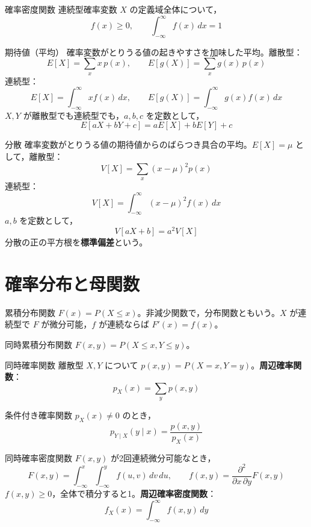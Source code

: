 \documentclass[a4paper,11pt]{ltjsarticle}
\begin{document}
\begin{term}{確率密度関数}
連続型確率変数 $X$ の定義域全体について，
\[
f(x) \ge 0, \qquad \int_{-\infty}^{\infty} f(x)\,dx = 1
\]
\end{term}

\begin{term}{期待値（平均）}
確率変数がとりうる値の起きやすさを加味した平均。離散型：
\[
E[X] = \sum_x x\,p(x), \qquad E[g(X)] = \sum_x g(x)\,p(x)
\]
連続型：
\[
E[X] = \int_{-\infty}^{\infty} x f(x)\,dx, \qquad E[g(X)] = \int_{-\infty}^{\infty} g(x)f(x)\,dx
\]
$X,Y$ が離散型でも連続型でも，$a,b,c$ を定数として，
\[
E[aX+bY+c] = aE[X]+bE[Y]+c
\]
\end{term}

\begin{term}{分散}
確率変数がとりうる値の期待値からのばらつき具合の平均。$E[X]=\mu$ として，離散型：
\[
V[X] = \sum_x (x-\mu)^2 p(x)
\]
連続型：
\[
V[X] = \int_{-\infty}^{\infty} (x-\mu)^2 f(x)\,dx
\]
$a,b$ を定数として，
\[
V[aX+b] = a^2 V[X]
\]
分散の正の平方根を\textbf{標準偏差}という。
\end{term}

\section{確率分布と母関数}

\begin{term}{累積分布関数}
$F(x) = P(X\le x)$。非減少関数で，分布関数ともいう。$X$ が連続型で $F$ が微分可能，$f$ が連続ならば $F'(x)=f(x)$。
\end{term}

\begin{term}{同時累積分布関数}
$F(x,y) = P(X\le x, Y\le y)$。
\end{term}

\begin{term}{同時確率関数}
離散型 $X,Y$ について $p(x,y)=P(X=x,Y=y)$。\textbf{周辺確率関数}：
\[
p_X(x) = \sum_y p(x,y)
\]
\end{term}

\begin{term}{条件付き確率関数}
$p_X(x)\ne 0$ のとき，
\[
p_{Y\mid X}(y\mid x) = \frac{p(x,y)}{p_X(x)}
\]
\end{term}

\begin{term}{同時確率密度関数}
$F(x,y)$ が2回連続微分可能なとき，
\[
F(x,y) = \int_{-\infty}^{x}\int_{-\infty}^{y} f(u,v)\,dv\,du,\qquad
f(x,y) = \frac{\partial^2}{\partial x\,\partial y}F(x,y)
\]
$f(x,y)\ge 0$，全体で積分すると1。\textbf{周辺確率密度関数}：
\[
f_X(x) = \int_{-\infty}^{\infty} f(x,y)\,dy
\]
\end{term}
\end{document}
